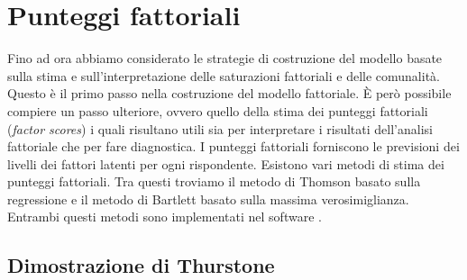 %
%
%
%


\section{Punteggi fattoriali}

Fino ad ora abbiamo considerato le strategie di costruzione del modello basate sulla
stima e sull'interpretazione delle saturazioni fattoriali e delle comunalità. Questo è il primo passo nella costruzione del modello fattoriale. È però possibile compiere un passo ulteriore, ovvero quello della stima dei punteggi fattoriali (\emph{factor
scores}) i quali risultano utili sia per interpretare i risultati dell'analisi fattoriale che per fare diagnostica. I punteggi fattoriali forniscono le previsioni dei livelli dei fattori latenti  per ogni rispondente. Esistono vari metodi di stima dei punteggi fattoriali.  Tra questi troviamo il metodo di Thomson basato sulla regressione e il metodo di Bartlett basato sulla massima verosimiglianza.  Entrambi questi metodi sono implementati nel software \R.


\subsection{Dimostrazione di Thurstone}

